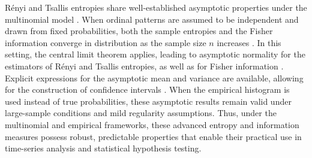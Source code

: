 \documentclass[12pt,a4paper]{article}
\begin{document}

Rényi and Tsallis entropies share well-established asymptotic properties under the multinomial model \cite{Pardo1997, Rey2024, Rey2023}. When ordinal patterns are assumed to be independent and drawn from fixed probabilities, both the sample entropies and the Fisher information converge in distribution as the sample size $n$ increases \cite{Rey2024, Rey2023}. In this setting, the central limit theorem applies, leading to asymptotic normality for the estimators of Rényi and Tsallis entropies, as well as for Fisher information \cite{Bobkov2019, Rey2023}. Explicit expressions for the asymptotic mean and variance are available, allowing for the construction of confidence intervals \cite{Pardo1997, Rey2024}. When the empirical histogram is used instead of true probabilities, these asymptotic results remain valid under large-sample conditions and mild regularity assumptions. Thus, under the multinomial and empirical frameworks, these advanced entropy and information measures possess robust, predictable properties that enable their practical use in time-series analysis and statistical hypothesis testing.

	
	

\end{document}
